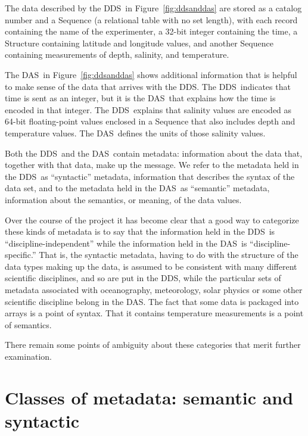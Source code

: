\documentclass{codata}
\newcommand{\dds}{\ac{DDS}}
\newcommand{\das}{\ac{DAS}}
\begin{document}
The data described by the \dds\ in Figure~\ref{fig:ddsanddas} are
stored as a catalog number and a Sequence (a relational table with no
set length), with each record containing the name of the experimenter,
a 32-bit integer containing the time, a Structure containing latitude
and longitude values, and another Sequence containing measurements of
depth, salinity, and temperature.

The \das\ in Figure~\ref{fig:ddsanddas} shows additional information
that is helpful to make sense of the data that arrives with the \dds.
The \dds\ indicates that time is sent as an integer, but it is the
\das\ that explains how the time is encoded in that integer.  The
\dds\ explains that salinity values are encoded as 64-bit
floating-point values enclosed in a Sequence that also includes depth
and temperature values.  The \das\ defines the units of those salinity
values.

Both the \dds\ and the \das\ contain metadata: information about the
data that, together with that data, make up the message.  
We refer to the metadata held in the \dds\ as ``syntactic'' metadata,
information that describes the syntax of the data set, and to the
metadata held in the \das\ as ``semantic'' metadata, information about
the semantics, or meaning, of the data values.


Over the course of the project it has become clear that a good way
to categorize these kinds of metadata is to say that the information
held in the \dds\ is ``discipline-independent'' while the information
held in the \das\ is ``discipline-specific.''  
That is, the syntactic metadata, having to
do with the structure of the data types making up the data, is assumed
to be consistent with many different scientific disciplines, and so
are put in the \dds, while the particular sets of metadata associated
with oceanography, meteorology, solar physics or some other scientific
discipline belong in the \das.  The fact that some data is packaged
into arrays is a point of syntax.  That it contains temperature
measurements is a point of semantics. 

There remain some points of ambiguity about these categories that
merit further examination.


\section{Classes of metadata: semantic and syntactic}
\end{document}
